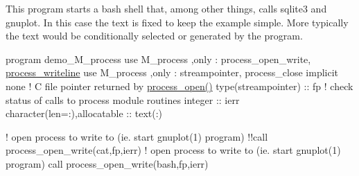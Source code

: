 This program starts a bash shell that, among other things, calls sqlite3 and gnuplot. In this case the text is fixed to keep the example simple. More typically the text would be conditionally selected or generated by the program.

program demo\+\_\+\+M\+\_\+process use M\+\_\+process ,only \+: process\+\_\+open\+\_\+write, \mbox{\hyperlink{interfacem__process_1_1process__writeline}{process\+\_\+writeline}} use M\+\_\+process ,only \+: streampointer, process\+\_\+close implicit none ! C file pointer returned by \mbox{\hyperlink{namespacem__process_a3c0f543a9ceff2671041d73660f60a59}{process\+\_\+open()}} type(streampointer) \+:\+: fp ! check status of calls to process module routines integer \+:\+: ierr character(len=\+:),allocatable \+:\+: text(\+:)

! open process to write to (ie. start gnuplot(1) program) !!call process\+\_\+open\+\_\+write(\textquotesingle{}cat\textquotesingle{},fp,ierr) ! open process to write to (ie. start gnuplot(1) program) call process\+\_\+open\+\_\+write(\textquotesingle{}bash\textquotesingle{},fp,ierr)

